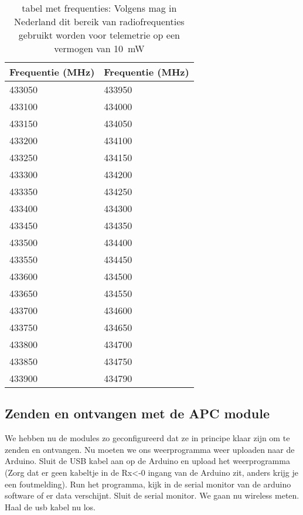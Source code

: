 \begin{center}
\begin{table}
    \begin{tabular}{ | l | l | }
    \hline
    Frequentie (MHz) & Frequentie (MHz)  \\ \hline
    433050 & 433950     \\ \hline
    433100 & 434000     \\ \hline
    433150 & 434050     \\ \hline
    433200 & 434100     \\ \hline
    433250 & 434150     \\ \hline
    433300 & 434200     \\ \hline
    433350 & 434250     \\ \hline
    433400 & 434300     \\ \hline
    433450 & 434350     \\ \hline
    433500 & 434400     \\ \hline
    433550 & 434450     \\ \hline
    433600 & 434500     \\ \hline
    433650 & 434550     \\ \hline
    433700 & 434600     \\ \hline
    433750 & 434650     \\ \hline
    433800 & 434700     \\ \hline
    433850 & 434750     \\ \hline
    433900 & 434790     \\ \hline
   \end{tabular}
   \caption{tabel met frequenties: Volgens \cite{Radio} mag in Nederland
   dit bereik van radiofrequenties gebruikt worden voor telemetrie op
   een vermogen van \SI{10}{\milli\watt}}
   \label{table:frequenties}
\end{table}
\end{center}

\subsection{Zenden en ontvangen met de APC module}

We hebben nu de modules zo geconfigureerd dat ze in principe klaar zijn
om te zenden en ontvangen. Nu moeten we ons weerprogramma weer uploaden
naar de Arduino. Sluit de USB kabel aan op de Arduino en upload het
weerprogramma (Zorg dat er geen kabeltje in de Rx<-0 ingang van de Arduino zit, 
anders krijg je een foutmelding). Run het programma, kijk in de serial monitor van de
arduino software of er data verschijnt. Sluit de serial monitor. We gaan
nu wireless meten. Haal de usb kabel nu los.

